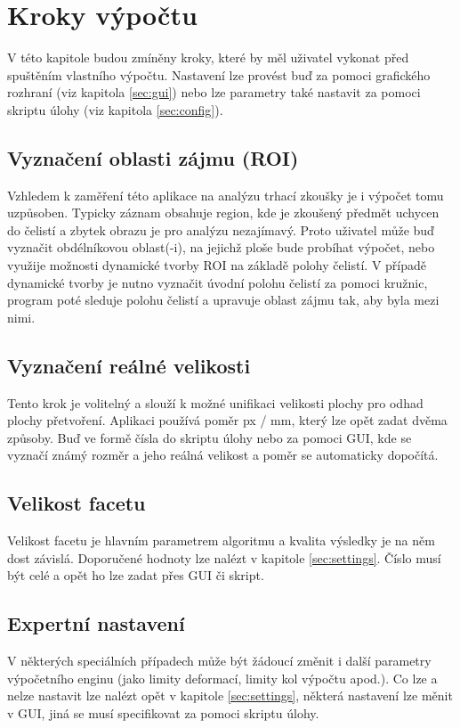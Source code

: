 \documentclass[a4paper,12pt]{article}
\begin{document}
\section{Kroky výpočtu}
V této kapitole budou zmíněny kroky, které by měl uživatel vykonat před spuštěním vlastního výpočtu. Nastavení lze provést buď za pomoci grafického rozhraní (viz kapitola \ref{sec:gui}) nebo lze parametry také nastavit za pomoci skriptu úlohy (viz kapitola \ref{sec:config}).
\subsection{Vyznačení oblasti zájmu (ROI)}
Vzhledem k zaměření této aplikace na analýzu trhací zkoušky je i výpočet tomu uzpůsoben. Typicky záznam obsahuje region, kde je zkoušený předmět uchycen do čelistí a zbytek obrazu je pro analýzu nezajímavý. Proto uživatel může buď vyznačit obdélníkovou oblast(-i), na jejichž ploše bude probíhat výpočet, nebo využije možnosti dynamické tvorby ROI na základě polohy čelistí. V případě dynamické tvorby je nutno vyznačit úvodní polohu čelistí za pomoci kružnic, program poté sleduje polohu čelistí a upravuje oblast zájmu tak, aby byla mezi nimi.
\subsection{Vyznačení reálné velikosti}
Tento krok je volitelný a slouží k možné unifikaci velikosti plochy pro odhad plochy přetvoření. Aplikaci používá poměr px / mm, který lze opět zadat dvěma způsoby. Buď ve formě čísla do skriptu úlohy nebo za pomoci GUI, kde se vyznačí známý rozměr a jeho reálná velikost a poměr se automaticky dopočítá.
\subsection{Velikost facetu}
Velikost facetu je hlavním parametrem algoritmu a kvalita výsledky je na něm dost závislá. Doporučené hodnoty lze nalézt v kapitole \ref{sec:settings}. Číslo musí být celé a opět ho lze zadat přes GUI či skript.
\subsection{Expertní nastavení}
V některých speciálních případech může být žádoucí změnit i další parametry výpočetního enginu (jako limity deformací, limity kol výpočtu apod.). Co lze a nelze nastavit lze nalézt opět v kapitole \ref{sec:settings}, některá nastavení lze měnit v GUI, jiná se musí specifikovat za pomoci skriptu úlohy.
\newpage
\end{document}
